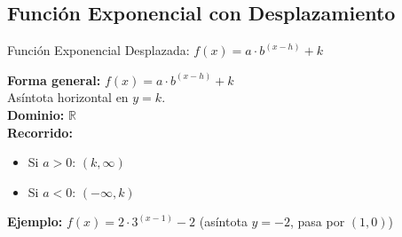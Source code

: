 \documentclass[12pt,a4paper]{article}
\begin{document}
\subsection{Función Exponencial con Desplazamiento}
\begin{funcbox}{Función Exponencial Desplazada: $f(x)=a\cdot b^{(x-h)}+k$}
\begin{minipage}[t]{0.55\textwidth}
    \textbf{Forma general:} $f(x)=a\cdot b^{(x-h)}+k$\\
    Asíntota horizontal en $y=k$.\\
    \textbf{Dominio:} $\mathbb{R}$\\
    \textbf{Recorrido:}
    \begin{itemize}
        \item Si $a>0$: $(k,\infty)$
        \item Si $a<0$: $(-\infty,k)$
    \end{itemize}
    \textbf{Ejemplo:} $f(x)=2\cdot 3^{(x-1)}-2$ (asíntota $y=-2$, pasa por $(1,0)$)
\end{minipage}\hfill
\begin{minipage}[t]{0.4\textwidth}
    \centering
\end{minipage}
\end{funcbox}

\end{document}
